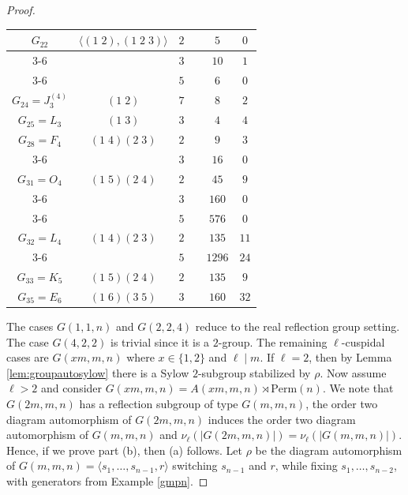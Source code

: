\documentclass[12pt]{amsart}
\theoremstyle{plain}
\theoremstyle{definition}
\numberwithin{equation}{section}
\numberwithin{equation}{section}
\newcommand{\xmark}{\ding{55}}
\begin{document}
\begin{proof}
\begin{table}[h!]
\begin{center}
{\begin{tabular}{ | c | c | c | c| c| c|}
							$G_{22}$ & $\langle (1\;2),(1\;2\;3)\rangle$ & $2$ & \xmark & $5$ & $0$ \\ \cline{3-6}
						& & $3$ & \xmark & $10$ & $1$ \\ \cline{3-6}
						& & $5$ & \xmark & $6$ & $0$ \\ \hline
						
						$G_{24}=J_3^{(4)}$ & $(1\;2)$ & $7$ & \checkmark &  $8$ & $2$ \\ \hline
						
						$G_{25}=L_3$ & $(1\;3)$ & $3$ & \checkmark & $4$ & $4$ \\ \hline
						
						
						$G_{28}=F_4$  & $(1\;4)(2\;3)$ & $2$ & \xmark & $9$ & $3$ \\ \cline{3-6}
						& & $3$ & \xmark & $16$ & $0$ \\ \hline
						
						$G_{31}=O_4$  & $(1\;5)(2\;4)$ & $2$ & \xmark & $45$ & $9$ \\ \cline{3-6}
						& & $3$ & \xmark & $160$ & $0$ \\ \cline{3-6}
						& & $5$ & \xmark &  $576$ & $0$ \\ \hline
						
						$G_{32}=L_4$ & $(1\;4)(2\;3)$ & $2$ & \checkmark & $135$ & $11$ \\ \cline{3-6}
						& & $5$ & \checkmark & $1296$ & $24$ \\ \hline
						
						$G_{33}=K_5$ & $(1\;5)(2\;4)$ & $2$ &  \xmark & $135$ & $9$  \\ \hline
						
						$G_{35}=E_6$ & $(1\;6)(3\;5)$ & $3$ & \checkmark & $160$ &  $32$ \\ \hline
				\end{tabular}}
				\label{table:sylowcomplexnormal}
			\end{center}
		\end{table}
		
		The cases $G(1,1,n)$ and $G(2,2,4)$ reduce to the real reflection group setting. The case $G(4,2,2)$ is trivial since it is a $2$-group. The remaining $\ell$-cuspidal cases are $G(xm,m,n)$ where $x\in\{1,2\}$ and $\ell\mid m$. If $\ell=2$, then by Lemma \ref{lem:groupautosylow} there is a Sylow $2$-subgroup stabilized by $\rho$. Now assume $\ell>2$ and consider $G(xm,m,n)=A(xm,m,n)\rtimes \text{Perm}(n)$. We note that $G(2m,m,n)$ has a reflection subgroup of type $G(m,m,n)$, the order two diagram automorphism of $G(2m,m,n)$ induces the order two diagram automorphism of $G(m,m,n)$ and $\nu_\ell(|G(2m,m,n)|)=\nu_\ell(|G(m,m,n)|)$. Hence, if we prove part (b), then (a) follows. Let $\rho$ be the diagram automorphism of $G(m,m,n)=\langle s_1,\dots,s_{n-1},r\rangle$ switching $s_{n-1}$ and $r$, while fixing $s_1,\dots,s_{n-2}$, with generators from Example \ref{gmpn}.
		

\end{proof}
\end{document}
